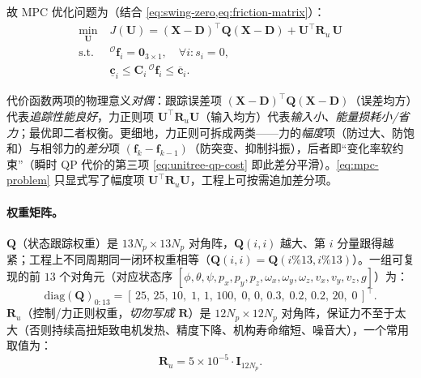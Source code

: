 故 MPC 优化问题为（结合 \cref{eq:swing-zero,eq:friction-matrix}）\cite{yu2021quadruped,dicarlo2018cheetah}：
\begin{equation}
\begin{aligned}
  \min_{\mathbf{U}}\;& J(\mathbf{U})=(\mathbf{X}-\mathbf{D})^\top\mathbf{Q}(\mathbf{X}-\mathbf{D})+\mathbf{U}^\top\mathbf{R}_u\,\mathbf{U}\\
  \text{s.t.}\;& {}^{\mathcal{O}}\boldsymbol{f}_i=\mathbf{0}_{3\times1},\quad\forall i:s_i=0,\\
  & \underline{\mathbf{c}}_i\le\mathbf{C}_i\,{}^{\mathcal{O}}\boldsymbol{f}_i\le\overline{\mathbf{c}}_i.
\end{aligned}
\label{eq:mpc-problem}
\end{equation}

\begin{note}\label{note:cost-dual}
代价函数两项的物理意义\emph{对偶}：跟踪误差项 $(\mathbf{X}-\mathbf{D})^\top\mathbf{Q}(\mathbf{X}-\mathbf{D})$（误差均方）代表\emph{追踪性能良好}，力正则项 $\mathbf{U}^\top\mathbf{R}_u\mathbf{U}$（输入均方）代表\emph{输入小、能量损耗小/省力}；最优即二者权衡。更细地，力正则可拆成两类——力的\emph{幅度}项（防过大、防饱和）与相邻力的\emph{差分}项 $(\mathbf{f}_{k}-\mathbf{f}_{k-1})$（防突变、抑制抖振），后者即“变化率软约束”（瞬时 QP 代价的第三项 \cref{eq:unitree-qp-cost} 即此差分平滑）。\cref{eq:mpc-problem} 只显式写了幅度项 $\mathbf{U}^\top\mathbf{R}_u\mathbf{U}$，工程上可按需追加差分项。
\end{note}

\paragraph{权重矩阵。}
$\mathbf{Q}$（状态跟踪权重）是 $13N_p\times13N_p$ 对角阵，$\mathbf{Q}(i,i)$ 越大、第 $i$ 分量跟得越紧；工程上不同周期同一闭环权重相等（$\mathbf{Q}(i,i)=\mathbf{Q}(i\%13,i\%13)$）。一组可复现的前 $13$ 个对角元（对应状态序 $[\phi,\theta,\psi,p_x,p_y,p_z,\omega_x,\omega_y,\omega_z,v_x,v_y,v_z,g]$）为\cite{yu2021quadruped}：
\begin{equation}
  \mathrm{diag}(\mathbf{Q})_{0:13}=[\,25,\,25,\,10,\;1,\,1,\,100,\;0,\,0,\,0.3,\;0.2,\,0.2,\,20,\;0\,]^\top.
  \label{eq:Q-diag}
\end{equation}
$\mathbf{R}_u$（控制/力正则权重，\emph{切勿写成 $\mathbf{R}$}）是 $12N_p\times12N_p$ 对角阵，保证力不至于太大（否则持续高扭矩致电机发热、精度下降、机构寿命缩短、噪音大），一个常用取值为\cite{yu2021quadruped}：
\begin{equation}
  \mathbf{R}_u=5\times10^{-5}\cdot\mathbf{I}_{12N_p}.
  \label{eq:Ru}
\end{equation}

